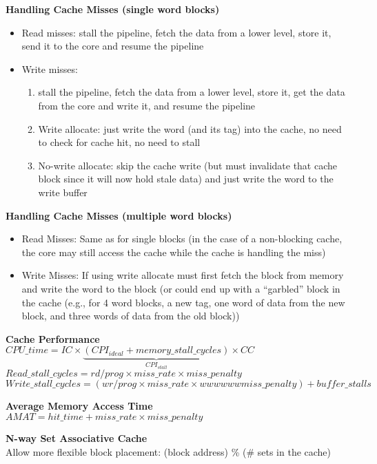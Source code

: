 \documentclass[10pt,letterpaper,landscape]{report}
\newcommand{\boxheight}{21.59cm}
\newcommand{\boxwidth}{8.85cm}
\begin{document}
\begin{small}
{\begin{minipage}[t][\boxheight][c]{\boxwidth}
	\textbf{Handling Cache Misses (single word blocks)}
	\begin{itemize}
		\item Read misses: stall the pipeline, fetch the data from a lower level, store it, send it to the core and resume the pipeline
		\item Write misses: 
		\begin{enumerate}
			\item stall the pipeline, fetch the data from a lower level, store it, get the data from the core and write it, and resume the pipeline
			\item Write allocate: just write the word (and its tag) into the cache, no need to check for cache hit, no need to stall
			\item No-write allocate: skip the cache write (but must invalidate that cache block since it will now hold stale data) and just write the word to the write buffer
		\end{enumerate}
	\end{itemize}

	\textbf{Handling Cache Misses (multiple word blocks)}
	\begin{itemize}
		\item Read Misses: Same as for single blocks (in the case of a non-blocking cache, the core may still access the cache while the cache is handling the miss)
		\item Write Misses: If using write allocate must first fetch the block from memory and write the word to the block (or could end up with a “garbled” block in the cache (e.g., for 4 word blocks, a new tag, one word of data from the new block, and three words of data from the old block))
	\end{itemize}

	\textbf{Cache Performance}\\
	$CPU\_time = IC \times \underbrace{(CPI_{ideal} + memory\_stall\_cycles)}_{CPI_{stall}} \times CC$\\
	$Read\_stall\_cycles = rd/prog \times miss\_rate \times miss\_penalty$\\
	$Write\_stall\_cycles = (wr/prog \times miss\_rate \times wwwwwwmiss\_ penalty) + buffer\_stalls$
	
	\textbf{Average Memory Access Time}\\
	$AMAT = hit\_time + miss\_rate \times miss\_penalty$
	
	\textbf{N-way Set Associative Cache}\\
	Allow more flexible block placement: (block address) \% (\# sets in the cache)
	


\end{minipage}}
\end{small}
\end{document}
